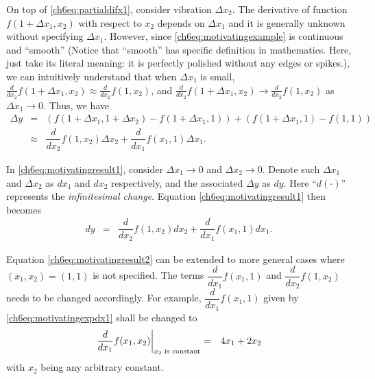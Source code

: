 On top of \eqref{ch6eq:partialdifx1}, consider vibration $\Delta x_2$. The derivative of function $f(1+\Delta x_1, x_2)$ with respect to $x_2$ depends on $\Delta x_1$ and it is generally unknown without specifying $\Delta x_1$. However, since \eqref{ch6eq:motivatingexample} is continuous and ``smooth'' (Notice that ``smooth'' has specific definition in mathematics. Here, just take its literal meaning: it is perfectly polished without any edges or spikes.), we can intuitively understand that when $\Delta x_1$ is small, $\frac{d}{dx_2}f(1+\Delta x_1, x_2) \approx \frac{d}{dx_2}f(1, x_2)$, and $\frac{d}{dx_2}f(1+\Delta x_1, x_2) \rightarrow \frac{d}{dx_2}f(1, x_2)$ as $\Delta x_1 \rightarrow 0$. Thus, we have
\begin{eqnarray}
	\Delta y &=& \left(f(1+\Delta x_1, 1 + \Delta x_2) -  f(1+\Delta x_1, 1)\right) + \left(f(1+\Delta x_1, 1) - f(1, 1)\right) \nonumber \\
	&\approx& \dfrac{d}{dx_2}f(1,x_2) \Delta x_2 + \dfrac{d}{dx_1}f(x_1,1) \Delta x_1. \label{ch6eq:motivatingresult1}
\end{eqnarray}

In \eqref{ch6eq:motivatingresult1}, consider $\Delta x_1 \rightarrow 0$ and $\Delta x_2 \rightarrow 0$. Denote such $\Delta x_1$ and $\Delta x_2$ as $dx_1$ and $dx_2$ respectively, and the associated $\Delta y$ as $dy$. Here ``$d(\cdot)$'' represents the \textit{infinitesimal change}. Equation \eqref{ch6eq:motivatingresult1} then becomes
\begin{eqnarray}
	d y &=& \dfrac{d}{dx_2}f(1,x_2) d x_2 + \dfrac{d}{dx_1}f(x_1,1) d x_1. \label{ch6eq:motivatingresult2}
\end{eqnarray}

Equation \eqref{ch6eq:motivatingresult2} can be extended to more general cases where $(x_1, x_2) = (1, 1)$ is not specified. The terms $\dfrac{d}{dx_1}f(x_1,1)$ and $\dfrac{d}{dx_2}f(1,x_2)$ needs to be changed accordingly. For example, $\dfrac{d}{dx_1}f(x_1,1)$ given by \eqref{ch6eq:motivatingexpdx1} shall be changed to
\begin{eqnarray}
	\left.\dfrac{d}{dx_1}f(x_1,x_2)\right|_{x_2 \textup{~is constant}} &=& 4x_1 + 2x_2 \nonumber
\end{eqnarray} 
with $x_2$ being any arbitrary constant. 

